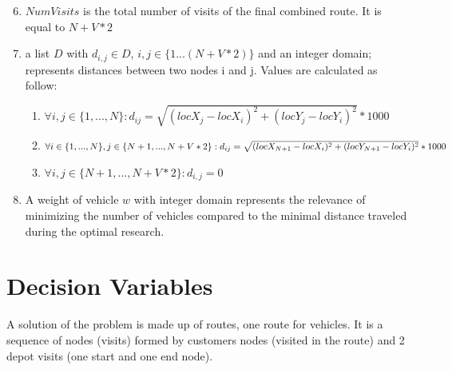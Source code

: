 \begin{enumerate}
 \setcounter{enumi}{5}
    \item \begin{math}NumVisits\end{math} is the total number of visits of the final combined route. It is equal to \begin{math}N + V * 2\end{math}
    \item a list \begin{math}D \end{math} with \begin{math}d_{i,j} \in D\end{math}, \begin{math}i,j \in \{1...(N+V*2)\}\end{math} and an integer domain; represents distances between two nodes i and j. Values are calculated as follow:\newline
    \begin{enumerate}
        \item\begin{math}\forall i,j \in \{1,...,N\}: d_{ij} = \sqrt{(locX_{j} - locX_{i})^2 + (locY_{j} - locY_{i})^2} * 1000\end{math}
        \item\begin{math}\forall i \in \{1,...,N\}, j \in \{N + 1,...,  N + V * 2\}:\newline d_{ij} = \sqrt{(locX_{N+1} - locX_{i})^2 + (locY_{N+1} - locY_{i})^2} * 1000\end{math}
        \item \begin{math}\forall i,j \in \{N + 1,...,  N + V * 2\}: d_{i,j} = 0\end{math}
    \end{enumerate}
    \item A weight of vehicle \begin{math}w\end{math} with integer domain represents the relevance of  minimizing the number of vehicles compared to the minimal distance traveled during the optimal research. 
\end{enumerate}
\section{Decision Variables}
A solution of the problem is made up of routes, one route for vehicles. It is a sequence of nodes (visits) formed by customers nodes (visited in the route) and 2 depot visits (one start and one end node).

